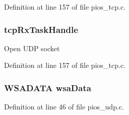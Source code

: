 Definition at line 157 of file pios\-\_\-tcp.\-c.

\hypertarget{group___p_i_o_s___u_d_p_ga0ba5f55b2aa18edf726675729e68624e}{
\subsubsection[{tcp\-Rx\-Task\-Handle}]{ tcp\-Rx\-Task\-Handle}}\label{group___p_i_o_s___u_d_p_ga0ba5f55b2aa18edf726675729e68624e}
Open U\-D\-P socket 

Definition at line 157 of file pios\-\_\-tcp.\-c.

\hypertarget{group___p_i_o_s___u_d_p_ga99d916e8fd71179b86cd135c2a27a905}{
\subsubsection[{wsa\-Data}]{\setlength{\rightskip}{0pt plus 5cm}W\-S\-A\-D\-A\-T\-A wsa\-Data}}\label{group___p_i_o_s___u_d_p_ga99d916e8fd71179b86cd135c2a27a905}


Definition at line 46 of file pios\-\_\-udp.\-c.

